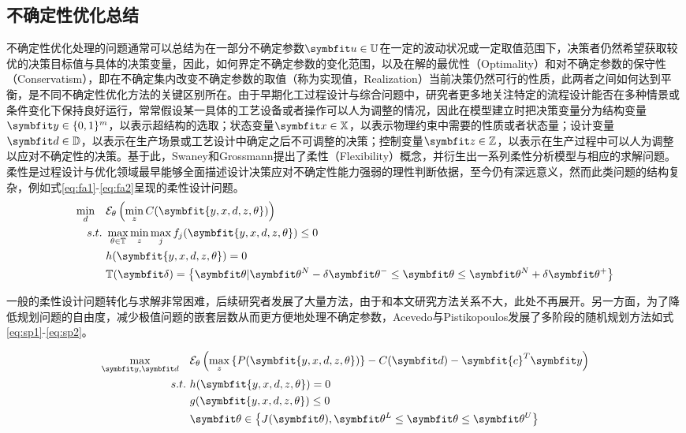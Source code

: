 \subsection{不确定性优化总结}
不确定性优化处理的问题通常可以总结为在一部分不确定参数$\symbfit u\in\mathbb{U}$在一定的波动状况或一定取值范围下，决策者仍然希望获取较优的决策目标值与具体的决策变量，因此，如何界定不确定参数的变化范围，以及在解的最优性（Optimality）和对不确定参数的保守性（Conservatism），即在不确定集内改变不确定参数的取值（称为实现值，Realization）当前决策仍然可行的性质，此两者之间如何达到平衡，是不同不确定性优化方法的关键区别所在。由于早期化工过程设计与综合问题中，研究者更多地关注特定的流程设计能否在多种情景或条件变化下保持良好运行，常常假设某一具体的工艺设备或者操作可以人为调整的情况，因此在模型建立时把决策变量分为结构变量$\symbfit y\in\{0,1\}^m$，以表示超结构的选取；状态变量$\symbfit x\in\mathbb{X}$，以表示物理约束中需要的性质或者状态量；设计变量$\symbfit d\in\mathbb{D}$，以表示在生产场景或工艺设计中确定之后不可调整的决策；控制变量$\symbfit z\in\mathbb{Z}$，以表示在生产过程中可以人为调整以应对不确定性的决策\cite{halemane1983,swaney1985,pisti1995}。基于此，Swaney和Grossmann提出了柔性（Flexibility）概念\cite{swaney1985}，并衍生出一系列柔性分析模型与相应的求解问题。柔性是过程设计与优化领域最早能够全面描述设计决策应对不确定性能力强弱的理性判断依据，至今仍有深远意义，然而此类问题的结构复杂，例如式\eqref{eq:fa1}-\eqref{eq:fa2}呈现的柔性设计问题\cite{ostrovsky2002}。
\begin{align}
  \label{eq:fa1}
  \min_{d}\quad & \mathcal{E}_\theta\left( \min_{z} C(\symbfit {y,x,d,z,\theta}) \right)\\
  s.t.\ & \max_{\theta\in\mathbb{T}}\min_{z}\max_{j} f_j(\symbfit {y,x,d,z,\theta}) \le 0 \\
  & h(\symbfit {y,x,d,z,\theta}) = 0 \\
  & \mathbb{T}(\symbfit \delta) = \left\{\symbfit \theta | \symbfit \theta^N - \delta\symbfit \theta^- \le \symbfit \theta \le \symbfit \theta^N + \delta\symbfit \theta^{+} \right\} \label{eq:fa2}
  \end{align}

一般的柔性设计问题转化与求解非常困难，后续研究者发展了大量方法，由于和本文研究方法关系不大，此处不再展开。另一方面，为了降低规划问题的自由度，减少极值问题的嵌套层数从而更方便地处理不确定参数，Acevedo与Pistikopoulos发展了多阶段的随机规划方法\cite{acevedo1998}如式\eqref{eq:sp1}-\eqref{eq:sp2}。

\begin{align}
  \max_{\symbfit y,\symbfit d}\quad & \mathcal{E}_\theta\left( \max_{z}\left\{P(\symbfit{y,x,d,z,\theta})\right\}-C(\symbfit d)-\symbfit{c}^T\symbfit y \right) \label{eq:sp1}\\
  s.t.\ & h(\symbfit{y,x,d,z,\theta}) = 0\\
  & g(\symbfit{y,x,d,z,\theta}) \le 0 \\
  & \symbfit \theta \in \left\{ J(\symbfit \theta), \symbfit \theta^L \le \symbfit \theta \le \symbfit \theta^U  \right\} \label{eq:sp2}
  \end{align}

